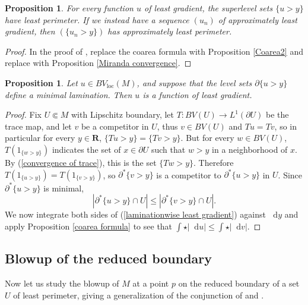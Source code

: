 \documentclass[reqno,12pt,letterpaper]{amsart}
\newcommand{\RR}{\mathbf{R}}
\newcommand*\dif{\mathop{}\!\mathrm{d}}
\newcommand{\loc}{\mathrm{loc}}
\newtheorem{proposition}[theorem]{Proposition}
\theoremstyle{definition}
\numberwithin{equation}{section}
\begin{document}
\begin{proposition}\label{level sets are minimal}
For every function $u$ of least gradient, the superlevel sets $\{u > y\}$ have least perimeter.
If we instead have a sequence $(u_n)$ of approximately least gradient, then $(\{u_n > y\})$ has approximately least perimeter.
\end{proposition}
\begin{proof}
In the proof of \cite[Theorem 1]{BOMBIERI1969}, replace the coarea formula \cite[Theorem 1.6]{Miranda66} with Proposition \ref{Coarea2} and replace \cite[Teorema 3]{Miranda67} with Proposition \ref{Miranda convergence}.
\end{proof}

\begin{proposition}\label{minimal bounding implies least gradient}
Let $u \in BV_\loc(M)$, and suppose that the level sets $\partial \{u > y\}$ define a minimal lamination.
Then $u$ is a function of least gradient.
\end{proposition}
\begin{proof}
Fix $U \Subset M$ with Lipschitz boundary, let $T: BV(U) \to L^1(\partial U)$ be the trace map, and let $v$ be a competitor in $U$, thus $v \in BV(U)$ and $Tu = Tv$, so in particular for every $y \in \RR$, $\{Tu > y\} = \{Tv > y\}$.
But for every $w \in BV(U)$, $T(1_{\{w > y\}})$ indicates the set of $x \in \partial U$ such that $w > y$ in a neighborhood of $x$.
By (\ref{convergence of trace}), this is the set $\{Tw > y\}$.
Therefore $T(1_{\{u > y\}}) = T(1_{\{v > y\}})$, so $\partial^* \{v > y\}$ is a competitor to $\partial^* \{u > y\}$ in $U$.
Since $\partial^* \{u > y\}$ is minimal,
\begin{equation}\label{laminationwise least gradient}
|\partial^* \{u > y\} \cap U| \leq |\partial^* \{v > y\} \cap U|.
\end{equation}
We now integrate both sides of (\ref{laminationwise least gradient}) against $\dif y$ and apply Proposition \ref{coarea formula} to see that $\int \star |\dif u| \leq \int \star |\dif v|$.
\end{proof}


\subsection{Blowup of the reduced boundary}
Now let us study the blowup of $M$ at a point $p$ on the reduced boundary of a set $U$ of least perimeter, giving a generalization of the conjunction of \cite[Theorem 9.3]{Giusti77} and \cite[Theorem 6.2.2]{Simons68}.
\end{document}
